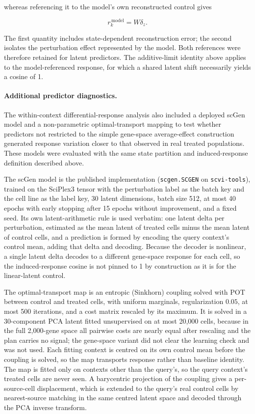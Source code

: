 \documentclass[11pt,letterpaper]{article}
\begin{document}
whereas referencing it to the model's own reconstructed control gives

$$
r^{\,\mathrm{model}}_k
=
W\delta_z.
$$

The first quantity includes state-dependent reconstruction error; the second isolates the
perturbation effect represented by the model. Both references were therefore retained for latent
predictors. The additive-limit identity above applies to the model-referenced response, for which a
shared latent shift necessarily yields a cosine of 1.

\paragraph{Additional predictor diagnostics.}
The within-context differential-response analysis also included a deployed scGen model and a
non-parametric optimal-transport mapping to test whether predictors not restricted to the simple
gene-space average-effect construction generated response variation closer to that observed in real
treated populations. These models were evaluated with the same state partition and induced-response
definition described above.

The scGen model is the published implementation\cite{ref4} (\texttt{scgen.SCGEN} on
\texttt{scvi-tools}\cite{scviTools}), trained on the SciPlex3 tensor with the perturbation label as the batch key
and the cell line as the label key, 30 latent dimensions, batch size 512, at most 40 epochs with
early stopping after 15 epochs without improvement, and a fixed seed. Its own latent-arithmetic
rule is used verbatim: one latent delta per perturbation, estimated as the mean latent of treated
cells minus the mean latent of control cells, and a prediction is formed by encoding the query
context's control mean, adding that delta and decoding. Because the decoder is nonlinear, a single
latent delta decodes to a different gene-space response for each cell, so the induced-response
cosine is not pinned to 1 by construction as it is for the linear-latent control.

The optimal-transport map is an entropic (Sinkhorn) coupling\cite{Sinkhorn} solved with POT\cite{POT} between control and
treated cells, with uniform marginals, regularization $0.05$, at most 500 iterations, and a cost
matrix rescaled by its maximum. It is solved in a 30-component PCA latent fitted unsupervised on at
most 20,000 cells, because in the full 2,000-gene space all pairwise costs are nearly equal after
rescaling and the plan carries no signal; the gene-space variant did not clear the learning check
and was not used. Each fitting context is centred on its own control mean before the coupling is
solved, so the map transports response rather than baseline identity. The map is fitted only on
contexts other than the query's, so the query context's treated cells are never seen. A barycentric
projection of the coupling gives a per-source-cell displacement, which is extended to the query's
real control cells by nearest-source matching in the same centred latent space and decoded through
the PCA inverse transform.
\end{document}
